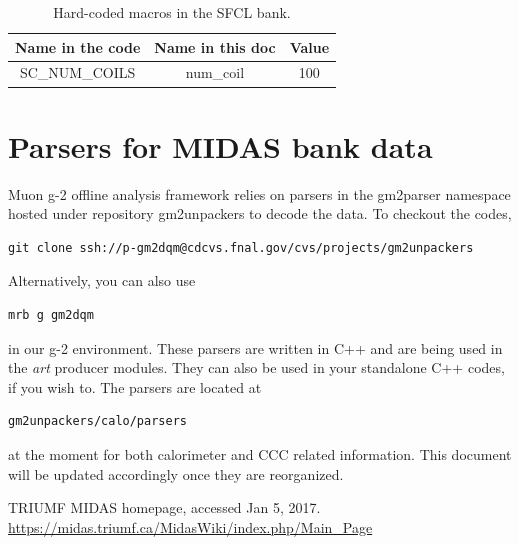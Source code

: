 \begin{table}[htbp]
\centering
\caption{Hard-coded macros in the SFCL bank.}
\begin{tabular}{|c|c|c|}
\hline
Name in the code    & Name in this doc & Value \\
\hline
SC\_NUM\_COILS &  num\_coil & 100 \\
\hline
\end{tabular} 
\label{tab:sfclmacro}
\end{table}

\newpage
\section{Parsers for MIDAS bank data}
Muon g-2 offline analysis framework relies on parsers in the gm2parser namespace hosted under repository gm2unpackers to decode the data. To checkout the codes, 

\begin{Verbatim}[frame=single]
git clone ssh://p-gm2dqm@cdcvs.fnal.gov/cvs/projects/gm2unpackers
\end{Verbatim}
%
Alternatively, you can also use 
\begin{Verbatim}[frame=single]
mrb g gm2dqm
\end{Verbatim}
in our g-2 environment.
%
These parsers are written in C++ and are being used in the \textit{art} producer modules. They can also be used in your standalone C++ codes, if you wish to. The parsers are located at
%
\begin{Verbatim}[frame=single]
gm2unpackers/calo/parsers
\end{Verbatim}
at the moment for both calorimeter and CCC related information. This document will be updated accordingly once they are reorganized.

\begin{thebibliography}{9}
TRIUMF MIDAS homepage, accessed Jan 5, 2017. 
\url{https://midas.triumf.ca/MidasWiki/index.php/Main_Page}

\end{thebibliography}


